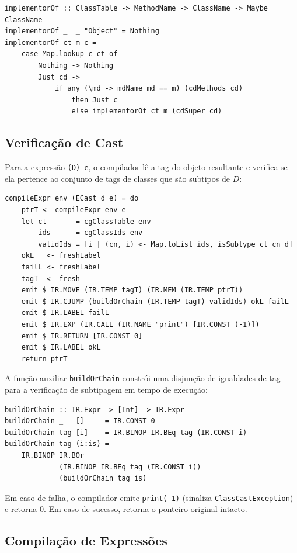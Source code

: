 \begin{verbatim}
implementorOf :: ClassTable -> MethodName -> ClassName -> Maybe ClassName
implementorOf _  _ "Object" = Nothing
implementorOf ct m c =
    case Map.lookup c ct of
        Nothing -> Nothing
        Just cd ->
            if any (\md -> mdName md == m) (cdMethods cd)
                then Just c
                else implementorOf ct m (cdSuper cd)
\end{verbatim}

\subsection{Verificação de Cast}

Para a expressão \texttt{(D) e}, o compilador lê a tag do objeto
resultante e verifica se ela pertence ao conjunto de tags de classes
que são subtipos de \(D\):

\begin{verbatim}
compileExpr env (ECast d e) = do
    ptrT <- compileExpr env e
    let ct       = cgClassTable env
        ids      = cgClassIds env
        validIds = [i | (cn, i) <- Map.toList ids, isSubtype ct cn d]
    okL   <- freshLabel
    failL <- freshLabel
    tagT  <- fresh
    emit $ IR.MOVE (IR.TEMP tagT) (IR.MEM (IR.TEMP ptrT))
    emit $ IR.CJUMP (buildOrChain (IR.TEMP tagT) validIds) okL failL
    emit $ IR.LABEL failL
    emit $ IR.EXP (IR.CALL (IR.NAME "print") [IR.CONST (-1)])
    emit $ IR.RETURN [IR.CONST 0]
    emit $ IR.LABEL okL
    return ptrT
\end{verbatim}

A função auxiliar \texttt{buildOrChain} constrói uma disjunção de
igualdades de tag para a verificação de subtipagem em tempo de execução:

\begin{verbatim}
buildOrChain :: IR.Expr -> [Int] -> IR.Expr
buildOrChain _   []     = IR.CONST 0
buildOrChain tag [i]    = IR.BINOP IR.BEq tag (IR.CONST i)
buildOrChain tag (i:is) =
    IR.BINOP IR.BOr
             (IR.BINOP IR.BEq tag (IR.CONST i))
             (buildOrChain tag is)
\end{verbatim}

Em caso de falha, o compilador emite \texttt{print(-1)} (sinaliza
\texttt{ClassCastException}) e retorna 0. Em caso de sucesso, retorna
o ponteiro original intacto.

\subsection{Compilação de Expressões}

